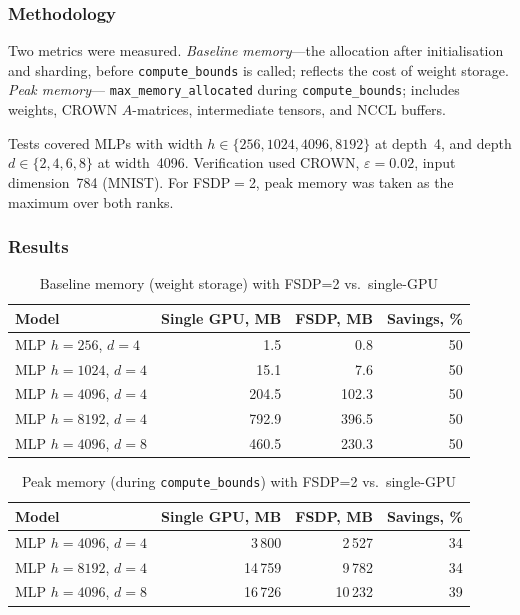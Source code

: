 \subsubsection{Methodology}

Two metrics were measured. \textit{Baseline memory}---the allocation after
initialisation and sharding, before \texttt{compute\_bounds} is called;
reflects the cost of weight storage. \textit{Peak memory}---
\texttt{max\_memory\_allocated} during \texttt{compute\_bounds}; includes
weights, CROWN $A$-matrices, intermediate tensors, and NCCL buffers.

Tests covered MLPs with width $h \in \{256, 1024, 4096, 8192\}$ at depth~4,
and depth $d \in \{2, 4, 6, 8\}$ at width~4096. Verification used CROWN,
$\varepsilon = 0.02$, input dimension~784 (MNIST). For FSDP$=$2, peak memory
was taken as the maximum over both ranks.

\subsubsection{Results}

\begin{table}[htbp]
\centering
\caption{Baseline memory (weight storage) with FSDP=2 vs.\ single-GPU}
\label{tab:fsdp-baseline}
\begin{tabular}{lrrr}
\toprule
Model & Single GPU, MB & FSDP, MB & Savings, \% \\
\midrule
MLP $h{=}256$, $d{=}4$   &     1.5 &    0.8 & 50 \\
MLP $h{=}1024$, $d{=}4$  &    15.1 &    7.6 & 50 \\
MLP $h{=}4096$, $d{=}4$  &   204.5 &  102.3 & 50 \\
MLP $h{=}8192$, $d{=}4$  &   792.9 &  396.5 & 50 \\
MLP $h{=}4096$, $d{=}8$  &   460.5 &  230.3 & 50 \\
\bottomrule
\end{tabular}
\end{table}

\begin{table}[htbp]
\centering
\caption{Peak memory (during \texttt{compute\_bounds}) with FSDP=2 vs.\ single-GPU}
\label{tab:fsdp-peak}
\begin{tabular}{lrrr}
\toprule
Model & Single GPU, MB & FSDP, MB & Savings, \% \\
\midrule
MLP $h{=}4096$, $d{=}4$  &   3\,800 &  2\,527 & 34 \\
MLP $h{=}8192$, $d{=}4$  &  14\,759 &  9\,782 & 34 \\
MLP $h{=}4096$, $d{=}8$  &  16\,726 & 10\,232 & 39 \\
\bottomrule
\end{tabular}
\end{table}

